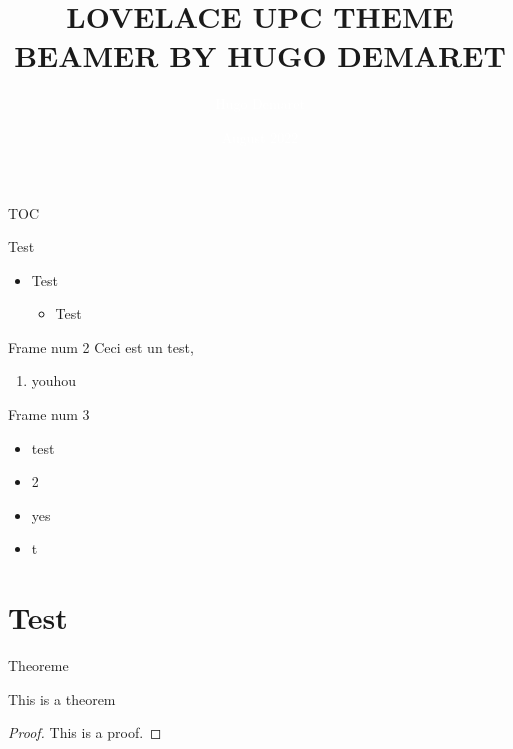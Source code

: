 \documentclass[]{beamer}
\title{LOVELACE UPC THEME BEAMER BY HUGO DEMARET}
\author{\textcolor{white}{Hugo Demaret}}
\date{\textcolor{white}{August 2022}}
\begin{document}
\maketitle

\begin{frame}{TOC}
    \tableofcontents
\end{frame}

\begin{frame}{Test}
\begin{itemize}
    \item Test
    \begin{itemize}
        \item Test
    \end{itemize}
\end{itemize}
\end{frame}
\begin{frame}{Frame num 2}
    Ceci est un test,
    \begin{enumerate}
        \item youhou
    \end{enumerate}
\end{frame}

\begin{frame}{Frame num 3}

\begin{itemize}
    \item <1-> test
    \item <2> 2
    \item <2-> yes
    \item <3> t
\end{itemize}
    
\end{frame}

\section{Test}
\begin{frame}{Theoreme}
    \begin{theorem}
    This is a theorem
    \end{theorem}
    \begin{proof}
        This is a proof.
    \end{proof}
\end{frame}
\end{document}
